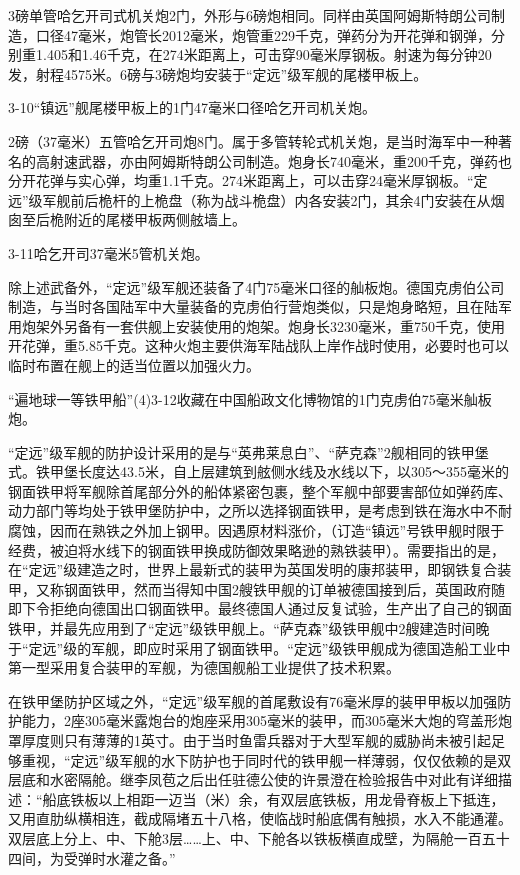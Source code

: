 \documentclass[12pt,UTF8]{ctexbook}
\begin{document}
3磅单管哈乞开司式机关炮2门，外形与6磅炮相同。同样由英国阿姆斯特朗公司制造，口径47毫米，炮管长2012毫米，炮管重229千克，弹药分为开花弹和钢弹，分别重1.405和1.46千克，在274米距离上，可击穿90毫米厚钢板。射速为每分钟20发，射程4575米。6磅与3磅炮均安装于“定远”级军舰的尾楼甲板上。

3-10“镇远”舰尾楼甲板上的1门47毫米口径哈乞开司机关炮。

2磅（37毫米）五管哈乞开司炮8门。属于多管转轮式机关炮，是当时海军中一种著名的高射速武器，亦由阿姆斯特朗公司制造。炮身长740毫米，重200千克，弹药也分开花弹与实心弹，均重1.1千克。274米距离上，可以击穿24毫米厚钢板。“定远”级军舰前后桅杆的上桅盘（称为战斗桅盘）内各安装2门，其余4门安装在从烟囱至后桅附近的尾楼甲板两侧舷墙上。

3-11哈乞开司37毫米5管机关炮。

除上述武备外，“定远”级军舰还装备了4门75毫米口径的舢板炮。德国克虏伯公司制造，与当时各国陆军中大量装备的克虏伯行营炮类似，只是炮身略短，且在陆军用炮架外另备有一套供舰上安装使用的炮架。炮身长3230毫米，重750千克，使用开花弹，重5.85千克。这种火炮主要供海军陆战队上岸作战时使用，必要时也可以临时布置在舰上的适当位置以加强火力。

“遍地球一等铁甲船”(4)3-12收藏在中国船政文化博物馆的1门克虏伯75毫米舢板炮。

“定远”级军舰的防护设计采用的是与“英弗莱息白”、“萨克森”2舰相同的铁甲堡式。铁甲堡长度达43.5米，自上层建筑到舷侧水线及水线以下，以305～355毫米的钢面铁甲将军舰除首尾部分外的船体紧密包裹，整个军舰中部要害部位如弹药库、动力部门等均处于铁甲堡防护中，之所以选择钢面铁甲，是考虑到铁在海水中不耐腐蚀，因而在熟铁之外加上钢甲。因遇原材料涨价，（订造“镇远”号铁甲舰时限于经费，被迫将水线下的钢面铁甲换成防御效果略逊的熟铁装甲）。需要指出的是，在“定远”级建造之时，世界上最新式的装甲为英国发明的康邦装甲，即钢铁复合装甲，又称钢面铁甲，然而当得知中国2艘铁甲舰的订单被德国接到后，英国政府随即下令拒绝向德国出口钢面铁甲。最终德国人通过反复试验，生产出了自己的钢面铁甲，并最先应用到了“定远”级铁甲舰上。“萨克森”级铁甲舰中2艘建造时间晚于“定远”级的军舰，即应时采用了钢面铁甲。“定远”级铁甲舰成为德国造船工业中第一型采用复合装甲的军舰，为德国舰船工业提供了技术积累。

在铁甲堡防护区域之外，“定远”级军舰的首尾敷设有76毫米厚的装甲甲板以加强防护能力，2座305毫米露炮台的炮座采用305毫米的装甲，而305毫米大炮的穹盖形炮罩厚度则只有薄薄的1英寸。由于当时鱼雷兵器对于大型军舰的威胁尚未被引起足够重视，“定远”级军舰的水下防护也于同时代的铁甲舰一样薄弱，仅仅依赖的是双层底和水密隔舱。继李凤苞之后出任驻德公使的许景澄在检验报告中对此有详细描述：“船底铁板以上相距一迈当（米）余，有双层底铁板，用龙骨脊板上下抵连，又用直肋纵横相连，截成隔堵五十八格，使临战时船底偶有触损，水入不能通灌。双层底上分上、中、下舱3层……上、中、下舱各以铁板横直成壁，为隔舱一百五十四间，为受弹时水灌之备。”
\end{document}
